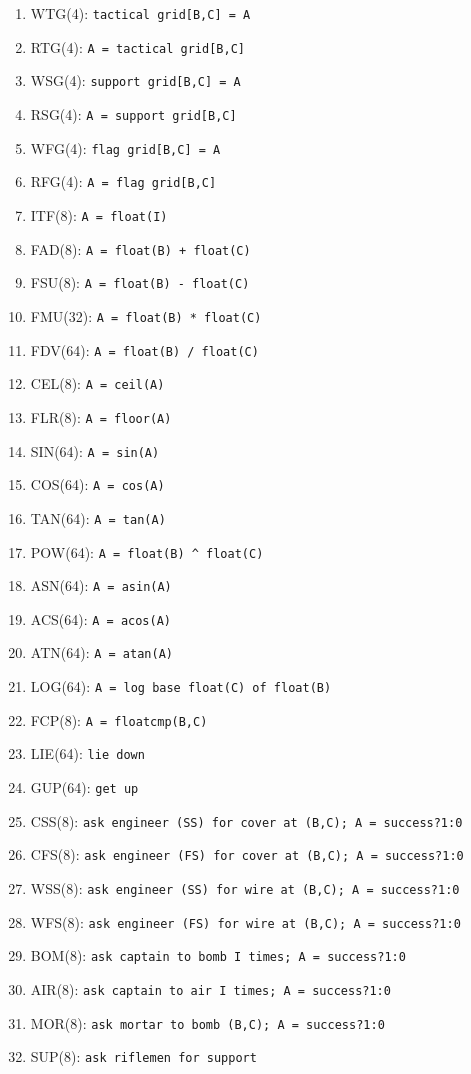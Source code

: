 \documentclass{article}
\begin{document}
\begin{enumerate}[noitemsep]
    \item WTG(4): \texttt{tactical grid[B,C] = A}
    \item RTG(4): \texttt{A = tactical grid[B,C]}
    \item WSG(4): \texttt{support grid[B,C] = A}
    \item RSG(4): \texttt{A = support grid[B,C]}
    \item WFG(4): \texttt{flag grid[B,C] = A}
    \item RFG(4): \texttt{A = flag grid[B,C]}
    \item ITF(8): \texttt{A = float(I)}
    \item FAD(8): \texttt{A = float(B) + float(C)}
    \item FSU(8): \texttt{A = float(B) - float(C)}
    \item FMU(32): \texttt{A = float(B) * float(C)}
    \item FDV(64): \texttt{A = float(B) / float(C)}
    \item CEL(8): \texttt{A = ceil(A)}
    \item FLR(8): \texttt{A = floor(A)}
    \item SIN(64): \texttt{A = sin(A)}
    \item COS(64): \texttt{A = cos(A)}
    \item TAN(64): \texttt{A = tan(A)}
    \item POW(64): \texttt{A = float(B) \^{} float(C)}
    \item ASN(64): \texttt{A = asin(A)}
    \item ACS(64): \texttt{A = acos(A)}
    \item ATN(64): \texttt{A = atan(A)}
    \item LOG(64): \texttt{A = log base float(C) of float(B)}
    \item FCP(8): \texttt{A = floatcmp(B,C)}
    \item LIE(64): \texttt{lie down}
    \item GUP(64): \texttt{get up}
    \item CSS(8): \texttt{ask engineer (SS) for cover at (B,C); A = success?1:0}
    \item CFS(8): \texttt{ask engineer (FS) for cover at (B,C); A = success?1:0}
    \item WSS(8): \texttt{ask engineer (SS) for wire at (B,C); A = success?1:0}
    \item WFS(8): \texttt{ask engineer (FS) for wire at (B,C); A = success?1:0}
    \item BOM(8): \texttt{ask captain to bomb I times; A = success?1:0}
    \item AIR(8): \texttt{ask captain to air I times; A = success?1:0}
    \item MOR(8): \texttt{ask mortar to bomb (B,C); A = success?1:0}
    \item SUP(8): \texttt{ask riflemen for support}
\end{enumerate}
\end{document}
